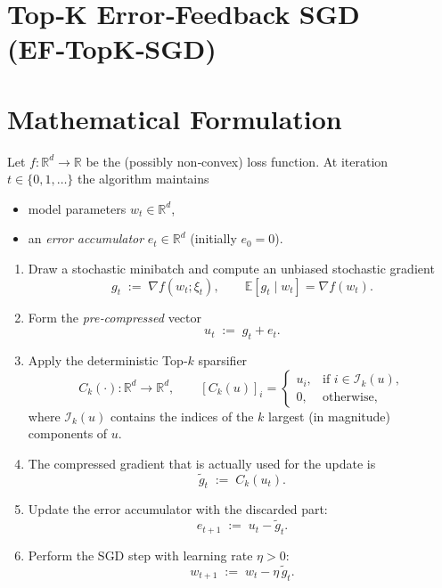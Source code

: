 \documentclass{article}
\begin{document}
\section*{Top‑K Error‑Feedback SGD (EF‑TopK‑SGD)}

\section*{Mathematical Formulation}
Let $f:\mathbb{R}^{d}\rightarrow\mathbb{R}$ be the (possibly non‑convex) loss function.  
At iteration $t\in\{0,1,\dots\}$ the algorithm maintains  

\begin{itemize}[noitemsep,topsep=0pt]
    \item model parameters $w_t\in\mathbb{R}^{d}$,
    \item an \emph{error accumulator} $e_t\in\mathbb{R}^{d}$ (initially $e_0=0$).
\end{itemize}

\begin{enumerate}[label=\arabic*)]
    \item Draw a stochastic minibatch and compute an unbiased stochastic gradient 
          \[
          g_t \;:=\; \nabla f(w_t; \xi_t),\qquad 
          \mathbb{E}[g_t\mid w_t]=\nabla f(w_t).
          \]
    \item Form the \emph{pre‑compressed} vector
          \[
          u_t \;:=\; g_t + e_t .
          \]
    \item Apply the deterministic Top‑$k$ sparsifier 
          \[
          C_k(\cdot):\mathbb{R}^{d}\rightarrow\mathbb{R}^{d},\qquad 
          [C_k(u)]_i = 
          \begin{cases}
          u_i, & \text{if } i\in\mathcal{I}_k(u),\\[2mm]
          0,   & \text{otherwise},
          \end{cases}
          \]
          where $\mathcal{I}_k(u)$ contains the indices of the $k$ largest (in magnitude) components of $u$.
    \item The compressed gradient that is actually used for the update is
          \[
          \tilde g_t \;:=\; C_k(u_t).
          \]
    \item Update the error accumulator with the discarded part:
          \[
          e_{t+1}\;:=\; u_t-\tilde g_t .
          \]
    \item Perform the SGD step with learning rate $\eta>0$:
          \[
          w_{t+1}\;:=\; w_t - \eta\,\tilde g_t .
          \]
\end{enumerate}
\end{document}
